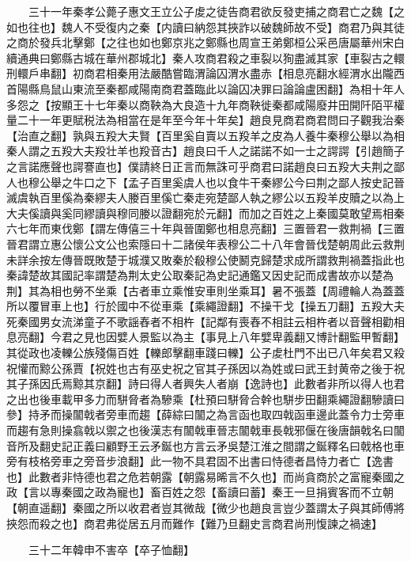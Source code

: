 　　三十一年秦孝公薨子惠文王立公子䖍之徒告商君欲反發吏捕之商君亡之魏【之如也往也】魏人不受復内之秦【内讀曰納怨其挾詐以破魏師故不受】商君乃與其徒之商於發兵北擊鄭【之往也如也鄭京兆之鄭縣也周宣王弟鄭桓公采邑唐屬華州宋白續通典曰鄭縣古城在華州郡城北】秦人攻商君殺之車裂以狥盡滅其家【車裂古之轘刑轘戶串翻】初商君相秦用法嚴酷嘗臨渭論囚渭水盡赤【相息亮翻水經渭水出隴西首陽縣鳥鼠山東流至秦都咸陽南商君蓋臨此以論囚决罪曰論論盧困翻】為相十年人多怨之【按顯王十七年秦以商鞅為大良造十九年商鞅徙秦都咸陽廢井田開阡陌平權量二十一年更賦税法為相當在是年至今年十年矣】趙良見商君商君問曰子觀我治秦【治直之翻】孰與五羖大夫賢【百里奚自賣以五羖羊之皮為人養牛秦穆公舉以為相秦人謂之五羖大夫羖壮羊也羖音古】趙良曰千人之諾諾不如一士之諤諤【引趙簡子之言諾應聲也諤謇直也】僕請終日正言而無誅可乎商君曰諾趙良曰五羖大夫荆之鄙人也穆公舉之牛口之下【孟子百里奚虞人也以食牛干秦繆公今曰荆之鄙人按史記晉滅虞執百里傒為秦繆夫人媵百里傒亡秦走宛楚鄙人執之繆公以五羖羊皮贖之以為上大夫傒讀與奚同繆讀與穆同媵以證翻宛於元翻】而加之百姓之上秦國莫敢望焉相秦六七年而東伐鄭【謂左傳僖三十年與晉圍鄭也相息亮翻】三置晉君一救荆禍【三置晉君謂立惠公懷公文公也索隱曰十二諸侯年表穆公二十八年會晉伐楚朝周此云救荆未詳余按左傳晉既敗楚于城濮又敗秦於殽穆公使鬭克歸楚求成所謂救荆禍蓋指此也秦諱楚故其國記率謂楚為荆太史公取秦記為史記通鑑又因史記而成書故亦以楚為荆】其為相也勞不坐乘【古者車立乘惟安車則坐乘耳】暑不張蓋【周禮輪人為蓋蓋所以覆冒車上也】行於國中不從車乘【乘繩證翻】不操干戈【操五刀翻】五羖大夫死秦國男女流涕童子不歌謡舂者不相杵【記鄰有喪舂不相註云相杵者以音聲相勸相息亮翻】今君之見也因嬖人景監以為主【事見上八年嬖卑義翻又博計翻監甲暫翻】其從政也凌轢公族殘傷百姓【轢郎擊翻車踐曰轢】公子䖍杜門不出已八年矣君又殺祝懽而黥公孫賈【祝姓也古有巫史祝之官其子孫因以為姓或曰武王封黄帝之後于祝其子孫因氏焉黥其京翻】詩曰得人者興失人者崩【逸詩也】此數者非所以得人也君之出也後車載甲多力而駢脅者為驂乘【杜預曰駢脅合幹也駢步田翻乘繩證翻驂讀曰參】持矛而操闟戟者旁車而趨【薛綜曰闟之為言函也取四戟函車邊此蓋令力士旁車而趨有急則操翕戟以禦之也後漢志有闟戟車晉志闟戟車長戟邪偃在後唐韻戟名曰闟音所及翻史記正義曰顧野王云矛鋋也方言云矛吳楚江淮之間謂之鋋釋名曰戟格也車旁有枝格旁車之旁音步浪翻】此一物不具君固不出書曰恃德者昌恃力者亡【逸書也】此數者非恃德也君之危若朝露【朝露易晞言不久也】而尚貪商於之富寵秦國之政【言以專秦國之政為寵也】畜百姓之怨【畜讀曰蓄】秦王一旦捐賓客而不立朝【朝直遥翻】秦國之所以收君者豈其微哉【微少也趙良言豈少蓋謂太子與其師傅將挾怨而殺之也】商君弗從居五月而難作【難乃旦翻史言商君尚刑愎諫之禍速】

　　三十二年韓申不害卒【卒子恤翻】

